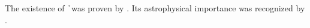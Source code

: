 The existence of \h\ was proven by \cite{bethe1929}.  %
Its astrophysical importance was recognized by \citet{Wildt1939a,Wildt1939b}.
